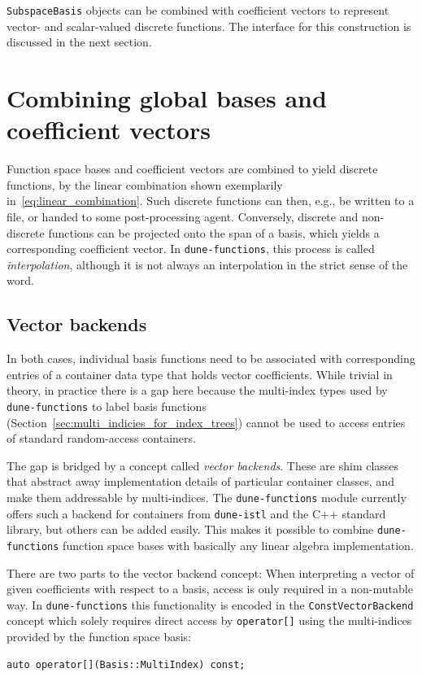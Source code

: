 \documentclass[a4paper,10pt,headings=normal,bibliography=totoc]{scrartcl}
\newcommand{\cpp}[1]{\lstinline[basicstyle=\ttfamily]!#1!}
\newcommand{\dunemodule}[1]{\texttt{#1}}
\begin{document}
\medskip

\cpp{SubspaceBasis} objects can be combined with
coefficient vectors to represent vector- and scalar-valued discrete functions.
The interface for this construction is discussed in the next section.


\section{Combining global bases and coefficient vectors}

Function space bases and coefficient vectors are combined to yield discrete functions,
by the linear combination shown exemplarily in~\eqref{eq:linear_combination}.
Such discrete functions can then, e.g., be written to a file, or handed to some
post-processing agent. Conversely, discrete and non-discrete functions can be
projected onto the span of a basis, which yields a corresponding coefficient
vector.  In \dunemodule{dune-functions}, this process is called \emph{interpolation},
although it is not always an interpolation in the strict sense of the word.

\subsection{Vector backends}
\label{subsec:backends}

In both cases, individual basis functions need to be associated with corresponding
entries of a container data type that holds vector coefficients. While trivial
in theory, in practice there is a gap here because the multi-index types used
by \dunemodule{dune-functions} to label basis functions (Section~\ref{sec:multi_indicies_for_index_trees})
cannot be used to access entries of standard random-access containers.

The gap is bridged by a concept called \emph{vector backends}.
These are shim classes that abstract away implementation details of particular
container classes, and make them addressable by multi-indices.
The \dunemodule{dune-functions} module currently offers such a backend
for containers from \dunemodule{dune-istl} and the C++ standard library,
but others can be added easily. This makes it possible to combine \dunemodule{dune-functions}
function space bases with basically any linear algebra implementation.

There are two parts to the vector backend concept:
When interpreting a vector of given coefficients with respect
to a basis,  access is only required in a non-mutable way.
In \dunemodule{dune-functions}
this functionality is encoded in the \cpp{ConstVectorBackend} concept which
solely requires direct access by \cpp{operator[]} using the multi-indices
provided by the function space basis:
\begin{lstlisting}[style=Interface]
  auto operator[](Basis::MultiIndex) const;
\end{lstlisting}
\end{document}
